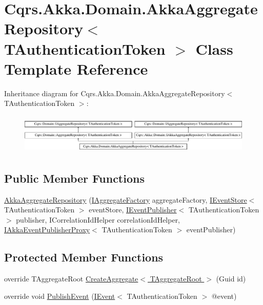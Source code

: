 \hypertarget{classCqrs_1_1Akka_1_1Domain_1_1AkkaAggregateRepository}{}\section{Cqrs.\+Akka.\+Domain.\+Akka\+Aggregate\+Repository$<$ T\+Authentication\+Token $>$ Class Template Reference}
\label{classCqrs_1_1Akka_1_1Domain_1_1AkkaAggregateRepository}
Inheritance diagram for Cqrs.\+Akka.\+Domain.\+Akka\+Aggregate\+Repository$<$ T\+Authentication\+Token $>$\+:\begin{figure}[H]
\begin{center}
\leavevmode
\includegraphics[height=1.958042cm]{classCqrs_1_1Akka_1_1Domain_1_1AkkaAggregateRepository}
\end{center}
\end{figure}
\subsection*{Public Member Functions}
\begin{DoxyCompactItemize}
\item 
\hyperlink{classCqrs_1_1Akka_1_1Domain_1_1AkkaAggregateRepository_afc997ba5187ca08d3f81a0c204eda3a2}{Akka\+Aggregate\+Repository} (\hyperlink{interfaceCqrs_1_1Domain_1_1Factories_1_1IAggregateFactory}{I\+Aggregate\+Factory} aggregate\+Factory, \hyperlink{interfaceCqrs_1_1Events_1_1IEventStore}{I\+Event\+Store}$<$ T\+Authentication\+Token $>$ event\+Store, \hyperlink{interfaceCqrs_1_1Events_1_1IEventPublisher}{I\+Event\+Publisher}$<$ T\+Authentication\+Token $>$ publisher, I\+Correlation\+Id\+Helper correlation\+Id\+Helper, \hyperlink{interfaceCqrs_1_1Akka_1_1Events_1_1IAkkaEventPublisherProxy}{I\+Akka\+Event\+Publisher\+Proxy}$<$ T\+Authentication\+Token $>$ event\+Publisher)
\end{DoxyCompactItemize}
\subsection*{Protected Member Functions}
\begin{DoxyCompactItemize}
\item 
override T\+Aggregate\+Root \hyperlink{classCqrs_1_1Akka_1_1Domain_1_1AkkaAggregateRepository_a889a80595755372614382c36092f30dc}{Create\+Aggregate$<$ T\+Aggregate\+Root $>$} (Guid id)
\item 
override void \hyperlink{classCqrs_1_1Akka_1_1Domain_1_1AkkaAggregateRepository_a144cbfdedb23039729ba5b3058f84e7a}{Publish\+Event} (\hyperlink{interfaceCqrs_1_1Events_1_1IEvent}{I\+Event}$<$ T\+Authentication\+Token $>$ @event)
\end{DoxyCompactItemize}
